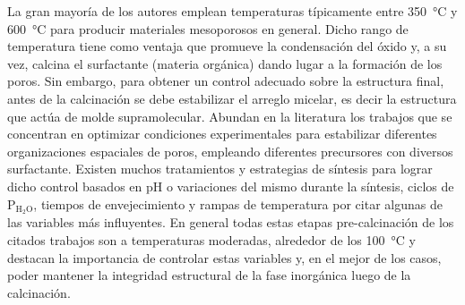 	La gran mayoría de los autores emplean temperaturas típicamente entre \SI{350}{\celsius} y \SI{600}{\celsius} para producir materiales mesoporosos en general.\cite{Kresge1992,Beck1992,DiRenzo1997}  Dicho rango de temperatura tiene como ventaja que promueve la condensación del óxido y, a su vez, calcina el surfactante (materia orgánica) dando lugar a la formación de los poros. Sin embargo, para obtener un control adecuado sobre la estructura final, antes de la calcinación se debe estabilizar el arreglo micelar, es decir la estructura que actúa de molde supramolecular. Abundan en la literatura los trabajos que se concentran en optimizar condiciones experimentales para estabilizar diferentes organizaciones espaciales de poros, empleando diferentes precursores con diversos surfactante\cite{Huo1996,Herregods2013,Grosso2001}. Existen muchos tratamientos y estrategias de síntesis para lograr dicho control basados en pH o variaciones del mismo durante la síntesis\cite{Doshi2000a,Soler-Illia2011,Boissiere2000,Huo1996,GonzalezSolveyra2017,Ichinose2002}, ciclos de P$_\text{H$_2$O}$\cite{Cagnol2002,Soler-Illia2012}, tiempos de envejecimiento\cite{Malfatti2009,Grosso2001} y rampas de temperatura\cite{Huang2002,Andrini2016,Soler-Illia2006,Rohlfing2005} por citar algunas de las variables más influyentes. En general todas estas etapas pre-calcinación de los citados trabajos son a temperaturas moderadas, alrededor de los \SI{100}{\celsius} y destacan la importancia de controlar estas variables y, en el mejor de los casos, poder mantener la integridad estructural de la fase inorgánica luego de la calcinación. 

